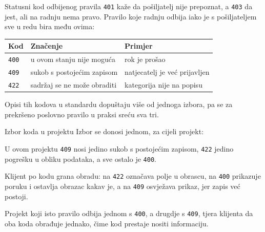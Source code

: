 \begin{frame}{Statusni kod odbijenog pravila}
\texttt{401} kaže da pošiljatelj nije prepoznat, a \texttt{403} da jest, ali na radnju nema pravo. Pravilo koje radnju odbija iako je s pošiljateljem sve u redu bira među ovima:

\vspace{0.6em}
\begin{center}
{\small
\setlength{\tabcolsep}{0pt}
\renewcommand{\arraystretch}{1.45}
\begin{tabular}{@{}L{1.1cm}L{5.2cm}L{4.9cm}@{}}
  \toprule
  \textbf{Kod} & \textbf{Značenje} & \textbf{Primjer} \\
  \midrule
  \texttt{400} & u ovom stanju nije moguća & rok je prošao \\
  \texttt{409} & sukob s postojećim zapisom & natjecatelj je već prijavljen \\
  \texttt{422} & sadržaj se ne može obraditi & kategorija nije na popisu \\
  \bottomrule
\end{tabular}
}
\end{center}

\vspace{0.6em}
Opisi tih kodova u standardu dopuštaju više od jednoga izbora, pa se za prekršeno poslovno pravilo u praksi sreću sva tri.
\end{frame}

\begin{frame}{Izbor koda u projektu}
Izbor se donosi jednom, za cijeli projekt:

\vspace{0.9em}
\begin{konvencija}
U ovom projektu \texttt{409} nosi jedino sukob s postojećim zapisom, \texttt{422} jedino pogrešku u obliku podataka, a sve ostalo je \texttt{400}.
\end{konvencija}

\vspace{0.9em}
Klijent po kodu grana obradu: na \texttt{422} označava polje u obrascu, na \texttt{400} prikazuje poruku i ostavlja obrazac kakav je, a na \texttt{409} osvježava prikaz, jer zapis već postoji.

\vspace{1.1em}
Projekt koji isto pravilo odbija jednom s \texttt{400}, a drugdje s \texttt{409}, tjera klijenta da oba koda obrađuje jednako, čime kod prestaje nositi informaciju.
\end{frame}

